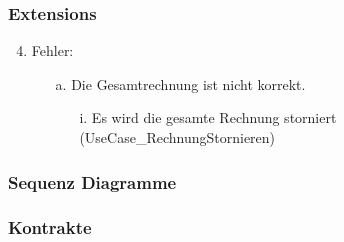 \documentclass[./detailed_overview_usecases.tex]{subfiles}
\begin{document}
    \subsubsection*{Extensions}
    \begin{enumerate}
        \setcounter{enumi}{3}
        \item Fehler:
        \begin{itemize}
            \item[a.] Die Gesamtrechnung ist nicht korrekt.
            \begin{itemize}
                \item[i.] Es wird die gesamte Rechnung storniert (UseCase_RechnungStornieren)
            \end{itemize}
        \end{itemize}
    \end{enumerate}
    \subsubsection{Sequenz Diagramme}
    \subsubsection{Kontrakte}
\end{document}
